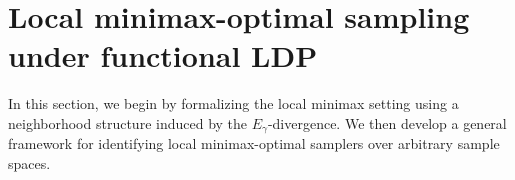 \documentclass[accepted]{article}
\theoremstyle{plain} %
\theoremstyle{definition}
\theoremstyle{remark}
\begin{document}





\vspace{0.1cm}
\section{Local minimax-optimal sampling under functional LDP}\label{sec: local functional}
\vspace{0.1cm}
In this section, we begin by formalizing the local minimax setting using a neighborhood structure induced by the $E_\gamma$-divergence. We then develop a general framework for identifying local minimax-optimal samplers over arbitrary sample spaces.
\end{document}
